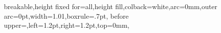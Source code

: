 \documentclass[UTF8,AutoFakeBold,AutoFakeSlant,zihao=-4]{ctexart}
\begin{document}




{
	breakable,height fixed for=all,height fill,colback=white,arc=0mm,outer arc=0pt,width=1.01\linewidth,boxrule=.7pt,
	before upper={\parindent24bp},left=1.2pt,right=1.2pt,top=0mm,
}


\pagestyle{fancy}
\setcounter{page}{1}
\fancyhf{}

\fancyfoot[C]{\fontsize{9pt}{9pt}\selectfont{\thepage}}
\renewcommand{\headrulewidth}{0pt}
\renewcommand{\footrulewidth}{0pt}

\setlength{\parskip}{0em}
\renewcommand{\baselinestretch}{1.53}
\setlength{\parindent}{1.02cm}

\end{document}
